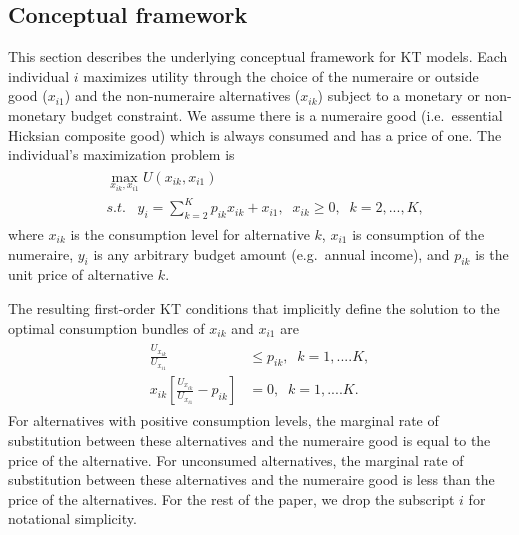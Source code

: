 \hypertarget{conceptual-framework}{%
\subsection{Conceptual framework}\label{conceptual-framework}}

This section describes the underlying conceptual framework for KT
models. Each individual \(i\) maximizes utility through the choice of
the numeraire or outside good (\(x_{i1}\)) and the non-numeraire
alternatives (\(x_{ik}\)) subject to a monetary or non-monetary budget
constraint. We assume there is a numeraire good (i.e.~essential Hicksian
composite good) which is always consumed and has a price of one. The
individual's maximization problem is \begin{align}
\begin{split}
 & \max_{x_{ik}, x_{i1}} U(x_{ik}, x_{i1}) \\
& s.t. \;\;\;y_i = \sum\limits^K_{k=2}p_{ik} x_{ik} + x_{i1}, \;\; x_{ik} \geq 0,\;\; k = 2,...,K,
  \end{split}
\end{align} \noindent where \(x_{ik}\) is the consumption level for
alternative \(k\), \(x_{i1}\) is consumption of the numeraire, \(y_i\)
is any arbitrary budget amount (e.g.~annual income), and \(p_{ik}\) is
the unit price of alternative \(k\).

The resulting first-order KT conditions that implicitly define the
solution to the optimal consumption bundles of \(x_{ik}\) and \(x_{i1}\)
are \begin{align}
\label{eq:kt_conditions}
\begin{split}
 \frac{U_{x_{ik}}}{U_{x_{i1}}} & \leq p_{ik},\; \; k = 1,....K , \\
  x_{ik}\left[\frac{U_{x_{ik}}}{U_{x_{i1}}} - p_{ik} \right] & = 0,\; \; k = 1,....K.
  \end{split}
\end{align} For alternatives with positive consumption levels, the
marginal rate of substitution between these alternatives and the
numeraire good is equal to the price of the alternative. For unconsumed
alternatives, the marginal rate of substitution between these
alternatives and the numeraire good is less than the price of the
alternatives. For the rest of the paper, we drop the subscript \(i\) for
notational simplicity.

